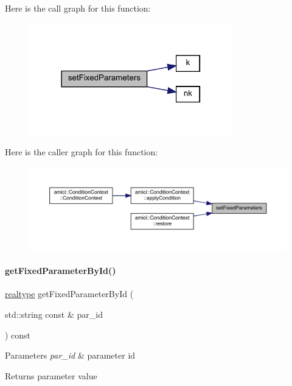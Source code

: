 Here is the call graph for this function\+:
\nopagebreak
\begin{figure}[H]
\begin{center}
\leavevmode
\includegraphics[width=250pt]{classamici_1_1_model_a14ba63ae81b4e8fa1f46884b703e2c30_cgraph}
\end{center}
\end{figure}
Here is the caller graph for this function\+:
\nopagebreak
\begin{figure}[H]
\begin{center}
\leavevmode
\includegraphics[width=350pt]{classamici_1_1_model_a14ba63ae81b4e8fa1f46884b703e2c30_icgraph}
\end{center}
\end{figure}
\mbox{\label{classamici_1_1_model_acc647ebbeaf0be737c7c165fa77eeca5}} 
\paragraph{\texorpdfstring{getFixedParameterById()}{getFixedParameterById()}}
{\footnotesize\ttfamily \mbox{\hyperlink{namespaceamici_a1bdce28051d6a53868f7ccbf5f2c14a3}{realtype}} get\+Fixed\+Parameter\+By\+Id (\begin{DoxyParamCaption}\item[{std\+::string const \&}]{par\+\_\+id }\end{DoxyParamCaption}) const}


\begin{DoxyParams}{Parameters}
{\em par\+\_\+id} & parameter id \\
\hline
\end{DoxyParams}
\begin{DoxyReturn}{Returns}
parameter value 
\end{DoxyReturn}


